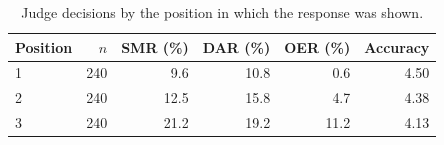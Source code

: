 \begin{table}[H]
\caption{Judge decisions by the position in which the response was shown.}
\label{tab:position:bias}
\centering
\begin{tabular}{lrrrrr}
\toprule
Position & $n$ & SMR (\%) & DAR (\%) & OER (\%) & Accuracy \\
\midrule
1 & 240 & 9.6 & 10.8 & 0.6 & 4.50 \\
2 & 240 & 12.5 & 15.8 & 4.7 & 4.38 \\
3 & 240 & 21.2 & 19.2 & 11.2 & 4.13 \\
\bottomrule
\end{tabular}
\end{table}

